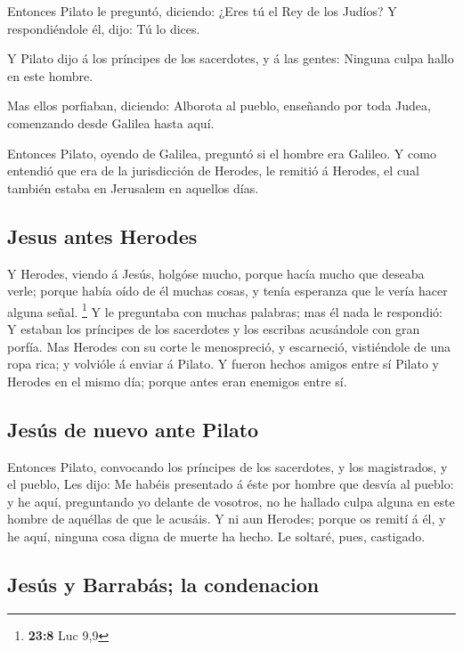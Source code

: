  Entonces Pilato le preguntó, diciendo: ¿Eres tú el Rey de
los Judíos? Y respondiéndole él, dijo: Tú lo dices.

 Y Pilato dijo á los príncipes de los sacerdotes, y á las
gentes: Ninguna culpa hallo en este hombre.

 Mas ellos porfiaban, diciendo: Alborota al pueblo,
enseñando por toda Judea, comenzando desde Galilea hasta aquí.

 Entonces Pilato, oyendo de Galilea, preguntó si el hombre
era Galileo.  Y como entendió que era de la jurisdicción de
Herodes, le remitió á Herodes, el cual también estaba en Jerusalem en
aquellos días.

\hypertarget{jesus-antes-herodes}{%
\subsection{Jesus antes Herodes}\label{jesus-antes-herodes}}

 Y Herodes, viendo á Jesús, holgóse mucho, porque hacía
mucho que deseaba verle; porque había oído de él muchas cosas, y tenía
esperanza que le vería hacer alguna señal. \footnote{\textbf{23:8} Luc
  9,9}  Y le preguntaba con muchas palabras; mas él nada le
respondió:  Y estaban los príncipes de los sacerdotes y los
escribas acusándole con gran porfía.  Mas Herodes con su
corte le menospreció, y escarneció, vistiéndole de una ropa rica; y
volvióle á enviar á Pilato.  Y fueron hechos amigos entre
sí Pilato y Herodes en el mismo día; porque antes eran enemigos entre
sí.

\hypertarget{jesuxfas-de-nuevo-ante-pilato}{%
\subsection{Jesús de nuevo ante
Pilato}\label{jesuxfas-de-nuevo-ante-pilato}}

 Entonces Pilato, convocando los príncipes de los
sacerdotes, y los magistrados, y el pueblo,  Les dijo: Me
habéis presentado á éste por hombre que desvía al pueblo: y he aquí,
preguntando yo delante de vosotros, no he hallado culpa alguna en este
hombre de aquéllas de que le acusáis.  Y ni aun Herodes;
porque os remití á él, y he aquí, ninguna cosa digna de muerte ha hecho.
 Le soltaré, pues, castigado.

\hypertarget{jesuxfas-y-barrabuxe1s-la-condenacion}{%
\subsection{Jesús y Barrabás; la
condenacion}\label{jesuxfas-y-barrabuxe1s-la-condenacion}}

